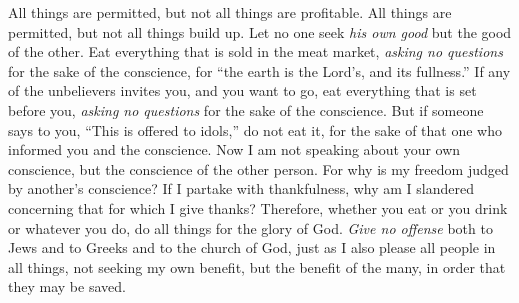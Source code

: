 \begin{biblechapter}
 All things are permitted, but not all things are profitable. All things are permitted, but not all things build up.
\verse Let no one seek \textit{his own good} but the good of the other.
\verse Eat everything that is sold in the meat market, \textit{asking no questions} for the sake of the conscience,
\verse for “the earth is the Lord’s, and its fullness.”
\verse If any of the unbelievers invites you, and you want to go, eat everything that is set before you, \textit{asking no questions} for the sake of the conscience.
\verse But if someone says to you, “This is offered to idols,” do not eat it, for the sake of that one who informed you and the conscience.
\verse Now I am not speaking about your own conscience, but the conscience of the other person. For why is my freedom judged by another’s conscience?
\verse If I partake with thankfulness, why am I slandered concerning that for which I give thanks?
\verse Therefore, whether you eat or you drink or whatever you do, do all things for the glory of God.
\verse \textit{Give no offense} both to Jews and to Greeks and to the church of God,
\verse just as I also please all people in all things, not seeking my own benefit, but the benefit of the many, in order that they may be saved.
\end{biblechapter}

